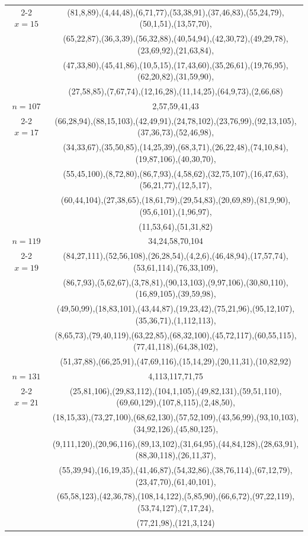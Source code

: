 \begin{tabular}{| c | c |}
\cline{2-2}
\(x=15\)
&(81,8,89),(4,44,48),(6,71,77),(53,38,91),(37,46,83),(55,24,79),(50,1,51),(13,57,70),\\
&(65,22,87),(36,3,39),(56,32,88),(40,54,94),(42,30,72),(49,29,78),(23,69,92),(21,63,84),\\
&(47,33,80),(45,41,86),(10,5,15),(17,43,60),(35,26,61),(19,76,95),(62,20,82),(31,59,90),\\
&(27,58,85),(7,67,74),(12,16,28),(11,14,25),(64,9,73),(2,66,68)\\
\hline 
\(n=107\) & 
2,57,59,41,43\\
\cline{2-2}
\(x=17\)
&(66,28,94),(88,15,103),(42,49,91),(24,78,102),(23,76,99),(92,13,105),(37,36,73),(52,46,98),\\
&(34,33,67),(35,50,85),(14,25,39),(68,3,71),(26,22,48),(74,10,84),(19,87,106),(40,30,70),\\
&(55,45,100),(8,72,80),(86,7,93),(4,58,62),(32,75,107),(16,47,63),(56,21,77),(12,5,17),\\
&(60,44,104),(27,38,65),(18,61,79),(29,54,83),(20,69,89),(81,9,90),(95,6,101),(1,96,97),\\
&(11,53,64),(51,31,82)\\
\hline 
\(n=119\) & 
34,24,58,70,104\\
\cline{2-2}
\(x=19\)
&(84,27,111),(52,56,108),(26,28,54),(4,2,6),(46,48,94),(17,57,74),(53,61,114),(76,33,109),\\
&(86,7,93),(5,62,67),(3,78,81),(90,13,103),(9,97,106),(30,80,110),(16,89,105),(39,59,98),\\
&(49,50,99),(18,83,101),(43,44,87),(19,23,42),(75,21,96),(95,12,107),(35,36,71),(1,112,113),\\
&(8,65,73),(79,40,119),(63,22,85),(68,32,100),(45,72,117),(60,55,115),(77,41,118),(64,38,102),\\
&(51,37,88),(66,25,91),(47,69,116),(15,14,29),(20,11,31),(10,82,92)\\
\hline 
\(n=131\) & 
4,113,117,71,75\\
\cline{2-2}
\(x=21\)
&(25,81,106),(29,83,112),(104,1,105),(49,82,131),(59,51,110),(69,60,129),(107,8,115),(2,48,50),\\
&(18,15,33),(73,27,100),(68,62,130),(57,52,109),(43,56,99),(93,10,103),(34,92,126),(45,80,125),\\
&(9,111,120),(20,96,116),(89,13,102),(31,64,95),(44,84,128),(28,63,91),(88,30,118),(26,11,37),\\
&(55,39,94),(16,19,35),(41,46,87),(54,32,86),(38,76,114),(67,12,79),(23,47,70),(61,40,101),\\
&(65,58,123),(42,36,78),(108,14,122),(5,85,90),(66,6,72),(97,22,119),(53,74,127),(7,17,24),\\
&(77,21,98),(121,3,124)\\
\hline 
\end{tabular}